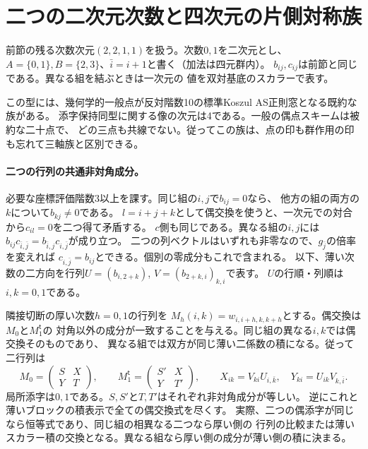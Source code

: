 \section{二つの二次元次数と四次元の片側対称族}
\label{sec:klein-two-doublets}
前節の残る次数次元$(2,2,1,1)$を扱う。次数$0,1$を二次元とし、
$A=\{0,1\}, B=\{2,3\}$、$\bar i=i+1$と書く（加法は四元群内）。
$b_{ij},c_{ij}$は前節と同じである。異なる組を結ぶときは一次元の
値を双対基底のスカラーで表す。

\begin{theorem}\label{thm:klein-two-doublets-generic}
この型には、幾何学的一般点が反対階数10の標準Koszul AS正則窓となる既約な族がある。
添字保持同型に関する像の次元は4である。一般の偶点スキームは被約な二十点で、
どの三点も共線でない。従ってこの族は、点の印も群作用の印も忘れて三軸族と区別できる。
\end{theorem}

\paragraph{二つの行列の共通非対角成分。}
必要な座標評価階数3以上を課す。同じ組の$i,j$で$b_{ij}=0$なら、
他方の組の両方の$k$について$b_{kj}\ne0$である。
$l=i+j+k$として偶交換を使うと、一次元での対合から$c_{il}=0$を二つ得て矛盾する。
$c$側も同じである。異なる組の$i,j$には
$b_{ij}c_{\bar i,\bar j}=b_{\bar i,j}c_{i,\bar j}$が成り立つ。
二つの列ベクトルはいずれも非零なので、$g_{\bar j}$の倍率を変えれば
$c_{i,\bar j}=b_{ij}$とできる。個別の零成分もこれで含まれる。
以下、薄い次数の二方向を行列$U=(b_{i,2+k})$, $V=(b_{2+k,i})_{k,i}$で表す。
$U$の行順・列順は$i,k=0,1$である。

隣接切断の厚い次数$h=0,1$の行列を
$M_h(i,k)=w_{i,i+h,k,k+h}$とする。偶交換は$M_0$と$M_1^{\mathsf t}$の
対角以外の成分が一致することを与える。同じ組の異なる$i,k$では偶交換そのものであり、
異なる組では双方が同じ薄い二係数の積になる。従って二行列は
\begin{equation}\label{eq:doublet-completions}
 M_0=\begin{pmatrix}S&X\\Y&T\end{pmatrix},\qquad
 M_1^{\mathsf t}=\begin{pmatrix}S'&X\\Y&T'\end{pmatrix},\qquad
 X_{ik}=V_{ki}U_{i,\bar k},\quad Y_{ki}=U_{ik}V_{k,\bar i}.
\end{equation}
局所添字は$0,1$である。$S,S'$と$T,T'$はそれぞれ非対角成分が等しい。
逆にこれと薄いブロックの積表示で全ての偶交換式を尽くす。
実際、二つの偶添字が同じなら恒等式であり、同じ組の相異なる二つなら厚い側の
行列の比較または薄いスカラー積の交換となる。異なる組なら厚い側の成分が薄い側の積に決まる。

